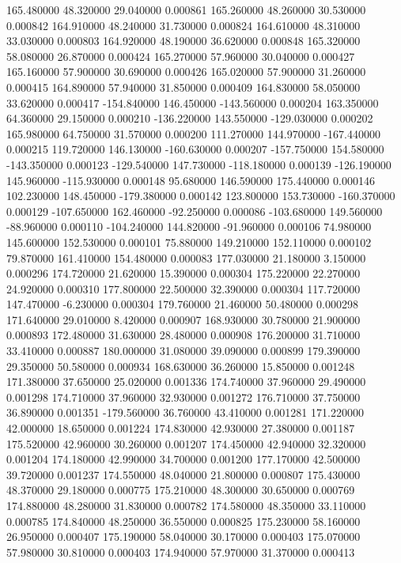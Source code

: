 165.480000 48.320000 29.040000 0.000861 
165.260000 48.260000 30.530000 0.000842 
164.910000 48.240000 31.730000 0.000824 
164.610000 48.310000 33.030000 0.000803 
164.920000 48.190000 36.620000 0.000848 
165.320000 58.080000 26.870000 0.000424 
165.270000 57.960000 30.040000 0.000427 
165.160000 57.900000 30.690000 0.000426 
165.020000 57.900000 31.260000 0.000415 
164.890000 57.940000 31.850000 0.000409 
164.830000 58.050000 33.620000 0.000417 
-154.840000 146.450000 -143.560000 0.000204 
163.350000 64.360000 29.150000 0.000210 
-136.220000 143.550000 -129.030000 0.000202 
165.980000 64.750000 31.570000 0.000200 
111.270000 144.970000 -167.440000 0.000215 
119.720000 146.130000 -160.630000 0.000207 
-157.750000 154.580000 -143.350000 0.000123 
-129.540000 147.730000 -118.180000 0.000139 
-126.190000 145.960000 -115.930000 0.000148 
95.680000 146.590000 175.440000 0.000146 
102.230000 148.450000 -179.380000 0.000142 
123.800000 153.730000 -160.370000 0.000129 
-107.650000 162.460000 -92.250000 0.000086 
-103.680000 149.560000 -88.960000 0.000110 
-104.240000 144.820000 -91.960000 0.000106 
74.980000 145.600000 152.530000 0.000101 
75.880000 149.210000 152.110000 0.000102 
79.870000 161.410000 154.480000 0.000083 
177.030000 21.180000 3.150000 0.000296 
174.720000 21.620000 15.390000 0.000304 
175.220000 22.270000 24.920000 0.000310 
177.800000 22.500000 32.390000 0.000304 
117.720000 147.470000 -6.230000 0.000304 
179.760000 21.460000 50.480000 0.000298 
171.640000 29.010000 8.420000 0.000907 
168.930000 30.780000 21.900000 0.000893 
172.480000 31.630000 28.480000 0.000908 
176.200000 31.710000 33.410000 0.000887 
180.000000 31.080000 39.090000 0.000899 
179.390000 29.350000 50.580000 0.000934 
168.630000 36.260000 15.850000 0.001248 
171.380000 37.650000 25.020000 0.001336 
174.740000 37.960000 29.490000 0.001298 
174.710000 37.960000 32.930000 0.001272 
176.710000 37.750000 36.890000 0.001351 
-179.560000 36.760000 43.410000 0.001281 
171.220000 42.000000 18.650000 0.001224 
174.830000 42.930000 27.380000 0.001187 
175.520000 42.960000 30.260000 0.001207 
174.450000 42.940000 32.320000 0.001204 
174.180000 42.990000 34.700000 0.001200 
177.170000 42.500000 39.720000 0.001237 
174.550000 48.040000 21.800000 0.000807 
175.430000 48.370000 29.180000 0.000775 
175.210000 48.300000 30.650000 0.000769 
174.880000 48.280000 31.830000 0.000782 
174.580000 48.350000 33.110000 0.000785 
174.840000 48.250000 36.550000 0.000825 
175.230000 58.160000 26.950000 0.000407 
175.190000 58.040000 30.170000 0.000403 
175.070000 57.980000 30.810000 0.000403 
174.940000 57.970000 31.370000 0.000413 
